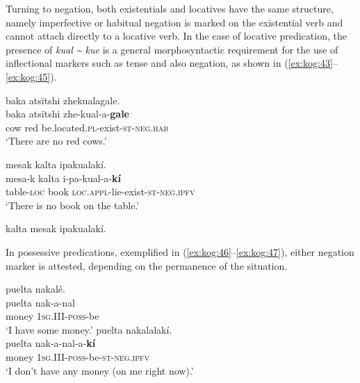 \documentclass[output=paper,colorlinks,citecolor=brown]{langscibook}
\begin{document}
Turning to negation, both existentials and locatives have the same structure, namely imperfective or habitual negation is marked on the existential verb and cannot attach directly to a locative verb. In the case of locative predication, the presence of \textit{kual {\textasciitilde} kue} is a general morphosyntactic requirement for the use of inflectional markers such as tense and also negation, as shown in (\ref{ex:kog:43}--\ref{ex:kog:45}).

\ea\label{ex:kog:43}baka atsïtshi zhekualagale.\\
    \gll baka atsïtshi zhe{}-kual{}-a{}-\textbf{gale}\\
          cow red be.located.\textsc{pl-}exist-\textsc{st-neg.hab}\\
    \glt ‘There are no red cows.’
\z 

\ea\label{ex:kog:44} mesak kalta ipakualakí.\\
    \gll mesa{}-k kalta i{}-pa{}-kual{}-a{}-\textbf{kí}\\
         table-\textsc{loc} book \textsc{loc.appl-}lie\textsc{{}-}exist-\textsc{st-neg.ipfv}\\
    \glt‘There is no book on the table.’
\z 

\newpage
\ea\label{ex:kog:45}kalta mesak ipakualakí.\\
    \z 
\z 

In possessive predications, exemplified in (\ref{ex:kog:46}--\ref{ex:kog:47}), either negation marker is attested, depending on the permanence of the situation.

\ea\label{ex:kog:46}
    \ea\label{ex:kog:46a}puelta nakalé.\\
        \gll  puelta nak-a-nal\\ 
              money \textsc{1sg.III{}-poss-}be\\
        \glt ‘I have some money.’
    \ex\label{ex:kog:46b}puelta nakalalakí.\\
        \gll  puelta nak-a-nal{}-a-\textbf{kí}\\
               money \textsc{1sg.III{}-poss-}be{}-\textsc{st}{}-\textsc{neg.ipfv}\\
        \glt ‘I don't have any money (on me right now).’
    \z
\z 
\end{document}
